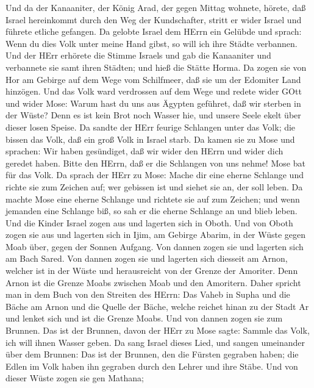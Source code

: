 Und da der Kanaaniter, der König Arad, der gegen Mittag
wohnete, hörete, daß Israel hereinkommt durch den Weg der Kundschafter,
stritt er wider Israel und führete etliche gefangen.  Da
gelobte Israel dem HErrn ein Gelübde und sprach: Wenn du dies Volk unter
meine Hand gibst, so will ich ihre Städte verbannen.  Und
der HErr erhörete die Stimme Israels und gab die Kanaaniter und
verbannete sie samt ihren Städten; und hieß die Stätte Horma.
 Da zogen sie von Hor am Gebirge auf dem Wege vom
Schilfmeer, daß sie um der Edomiter Land hinzögen. Und das Volk ward
verdrossen auf dem Wege  und redete wider GOtt und wider
Mose: Warum hast du uns aus Ägypten geführet, daß wir sterben in der
Wüste? Denn es ist kein Brot noch Wasser hie, und unsere Seele ekelt
über dieser losen Speise.  Da sandte der HErr feurige
Schlangen unter das Volk; die bissen das Volk, daß ein groß Volk in
Israel starb.  Da kamen sie zu Mose und sprachen: Wir haben
gesündiget, daß wir wider den HErrn und wider dich geredet haben. Bitte
den HErrn, daß er die Schlangen von uns nehme! Mose bat für das Volk.
 Da sprach der HErr zu Mose: Mache dir eine eherne Schlange
und richte sie zum Zeichen auf; wer gebissen ist und siehet sie an, der
soll leben.  Da machte Mose eine eherne Schlange und
richtete sie auf zum Zeichen; und wenn jemanden eine Schlange biß, so
sah er die eherne Schlange an und blieb leben.  Und die
Kinder Israel zogen aus und lagerten sich in Oboth.  Und
von Oboth zogen sie aus und lagerten sich in Ijim, am Gebirge Abarim, in
der Wüste gegen Moab über, gegen der Sonnen Aufgang.  Von
dannen zogen sie und lagerten sich am Bach Sared.  Von
dannen zogen sie und lagerten sich diesseit am Arnon, welcher ist in der
Wüste und herausreicht von der Grenze der Amoriter. Denn Arnon ist die
Grenze Moabs zwischen Moab und den Amoritern.  Daher
spricht man in dem Buch von den Streiten des HErrn: Das Vaheb in Supha
und die Bäche am Arnon  und die Quelle der Bäche, welche
reichet hinan zu der Stadt Ar und lenket sich und ist die Grenze Moabs.
 Und von dannen zogen sie zum Brunnen. Das ist der Brunnen,
davon der HErr zu Mose sagte: Sammle das Volk, ich will ihnen Wasser
geben.  Da sang Israel dieses Lied, und sangen umeinander
über dem Brunnen:  Das ist der Brunnen, den die Fürsten
gegraben haben; die Edlen im Volk haben ihn gegraben durch den Lehrer
und ihre Stäbe. Und von dieser Wüste zogen sie gen Mathana;
